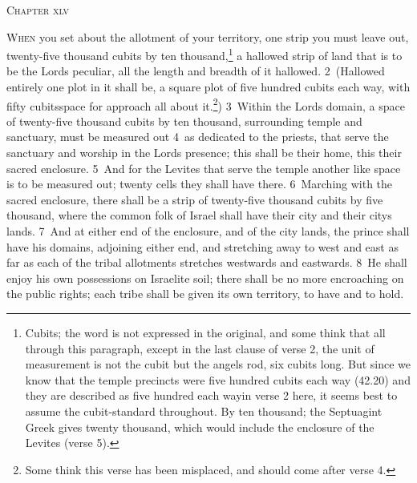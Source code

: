 \documentclass[10pt]{book} %
\begin{document}
\begin{large}\begin{center}\textsc{Chapter xlv}\end{center}\end{large}
\lettrine[lines=2]{W}{hen} you set about the allotment of your territory, one strip you must leave out, twenty-five thousand cubits by ten thousand,\footnote[1]{\textasciigrave Cubits\textquotesingle ; the word is not expressed in the original, and some think that all through this paragraph, except in the last clause of verse 2, the unit of measurement is not the cubit but the angel\textquotesingle s rod, six cubits long. But since we know that the temple precincts were five hundred cubits each way (42.20) and they are described as \textasciigrave five hundred each way\textquotesingle  in verse 2 here, it seems best to assume the cubit-standard throughout. \textasciigrave By ten thousand\textquotesingle ; the Septuagint Greek gives twenty thousand, which would include the enclosure of the Levites (verse 5).} a hallowed strip of land that is to be the Lord\textquotesingle s peculiar, all the length and breadth of it hallowed. \textcolor{benred8}{2}~(Hallowed entirely one plot in it shall be, a square plot of five hundred cubits each way, with fifty cubits\textquotesingle  space for approach all about it.\footnote[2]{Some think this verse has been misplaced, and should come after verse 4.}) \textcolor{benred8}{3}~Within the Lord\textquotesingle s domain, a space of twenty-five thousand cubits by ten thousand, surrounding temple and sanctuary, must be measured out \textcolor{benred8}{4}~as dedicated to the priests, that serve the sanctuary and worship in the Lord\textquotesingle s presence; this shall be their home, this their sacred enclosure. \textcolor{benred8}{5}~And for the Levites that serve the temple another like space is to be measured out; twenty cells they shall have there. \textcolor{benred8}{6}~Marching with the sacred enclosure, there shall be a strip of twenty-five thousand cubits by five thousand, where the common folk of Israel shall have their city and their city\textquotesingle s lands. \textcolor{benred8}{7}~And at either end of the enclosure, and of the city lands, the prince shall have his domains, adjoining either end, and stretching away to west and east as far as each of the tribal allotments stretches westwards and eastwards. \textcolor{benred8}{8}~He shall enjoy his own possessions on Israelite soil; there shall be no more encroaching on the public rights; each tribe shall be given its own territory, to have and to hold.
\end{document}
